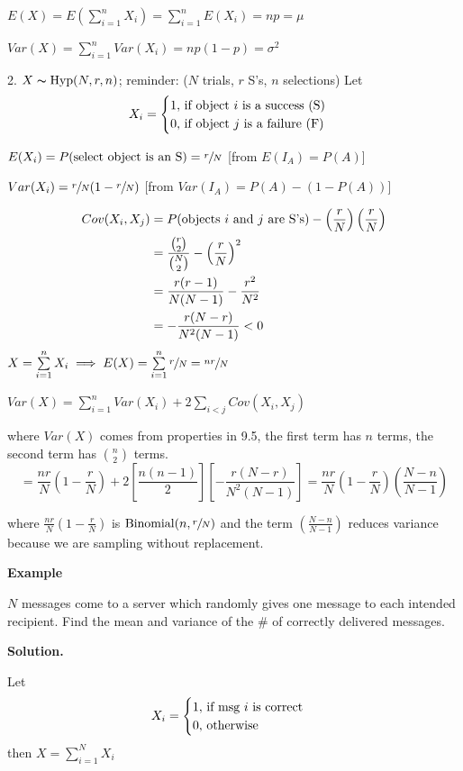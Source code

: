 $ E(X)=E(\sum\limits_{i=1}^{n} X_i)=\sum\limits_{i=1}^{n} E(X_i)=np=\mu $

$ Var(X)=\sum\limits_{i=1}^{n} Var(X_i)=np(1-p)=\sigma^2 $

2. $ X \thicksim \operatorname{Hyp}(N,r,n) $; reminder:
($ N $ trials, $ r $ S's, $ n $ selections)
Let
\[X_i=\begin{cases}
        1,\,\text{if object $ i $ is a success (S)} \\
        0,\,\text{if object $ j $ is a failure (F)}
    \end{cases} \]

$ E(X_i)=P(\text{select object is an S})=\sfrac{r}{N} $
[from $E(I_A)=P(A)$]

$ Var(X_i)=\sfrac{r}{N} (1-\sfrac{r}{N} ) $
[from $ Var(I_A)=P(A)-(1-P(A)) $]

\begin{align*}
    Cov(X_i,X_j)
     & =P(\text{objects $ i $ and $ j $ are S's})-
    \left(\frac{r}{N}\right)\left(\frac{r}{N}\right)                 \\
     & =\frac{\binom{r}{2}}{\binom{N}{2}}-\left(\frac{r}{N}\right)^2 \\
     & =\frac{r(r-1)}{N(N-1)} -\frac{r^2}{N^2}                       \\
     & =-\frac{r(N-r)}{N^2(N-1)}<0
\end{align*}
$ X=\sum\limits_{i=1}^{n} X_i\implies E(X)=\sum\limits_{i=1}^{n} \sfrac{r}{N} =
    \sfrac{nr}{N} $

$ Var(X)=\sum\limits_{i=1}^{n} Var(X_i)+2 \sum\limits_{i<j} Cov(X_i,X_j)  $

where $ Var(X) $ comes from properties in 9.5, the first term has $ n $ terms,
the second term has $ \binom{n}{2} $ terms.
\[
    = \frac{nr}{N} \left(1-\frac{r}{N}\right)+2\left[\frac{n(n-1)}{2}\right]
    \left[-\frac{r(N-r)}{N^2(N-1)}\right]
    = \frac{nr}{N} \left(1-\frac{r}{N}\right)
    \left(\frac{N-n}{N-1}\right)
\]

where $ \frac{nr}{N} \left(1-\frac{r}{N}\right)$ is $\operatorname{Binomial}(n,\sfrac{r}{N}) $
and the term $ \left(\frac{N-n}{N-1}\right) $
reduces variance because we are sampling without replacement.

\textbf{Example}

$ N $ messages come to a server which randomly gives one message to each
intended recipient. Find the mean and variance of the \# of correctly delivered
messages.

\textbf{Solution.}

Let
\[ X_i=
    \begin{cases}
        1,\,\text{if msg $ i $ is correct} \\
        0,\,\text{otherwise}
    \end{cases} \]
then $ X=\sum\limits_{i=1}^{N}X_i $

